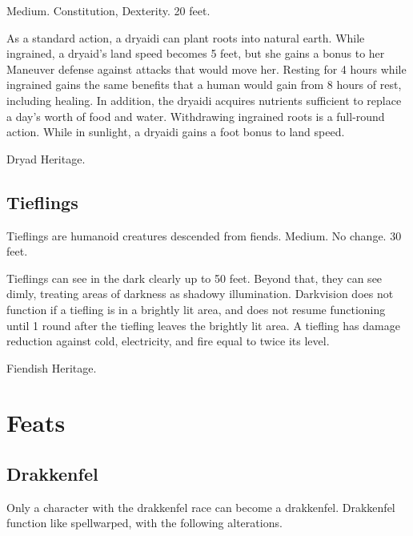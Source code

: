  Medium.
  Constitution,  Dexterity.
 20 feet.
\begin{itemize}
     As a standard action, a dryaidi can plant roots into natural earth. While ingrained, a dryaid's land speed becomes 5 feet, but she gains a  bonus to her Maneuver defense against attacks that would move her. Resting for 4 hours while ingrained gains the same benefits that a human would gain from 8 hours of rest, including healing. In addition, the dryaidi acquires nutrients sufficient to replace a day's worth of food and water. Withdrawing ingrained roots is a full-round action.
     While in sunlight, a dryaidi gains a  foot bonus to land speed.
\end{itemize}
 Dryad Heritage.

\subsection{Tieflings}

Tieflings are humanoid creatures descended from fiends.
 Medium.
 No change.
 30 feet.
\begin{itemize}
     Tieflings can see in the dark clearly up to 50 feet. Beyond that, they can see dimly, treating areas of darkness as shadowy illumination. Darkvision does not function if a tiefling is in a brightly lit area, and does not resume functioning until 1 round after the tiefling leaves the brightly lit area.
     A tiefling has damage reduction against cold, electricity, and fire equal to twice its level.
\end{itemize}
 Fiendish Heritage.

\section{Feats}

\subsection{Drakkenfel}

Only a character with the drakkenfel race can become a drakkenfel. Drakkenfel function like spellwarped, with the following alterations.

